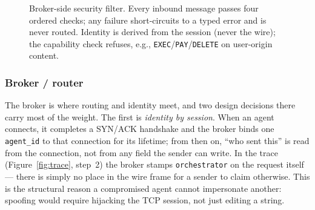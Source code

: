 \documentclass[11pt]{article}
\begin{document}
\begin{figure}[h]\centering
{}
\caption{Broker-side security filter. Every inbound message passes four ordered checks; any failure
short-circuits to a typed error and is never routed. Identity is derived from the session (never the
wire); the capability check refuses, e.g., \texttt{EXEC}/\texttt{PAY}/\texttt{DELETE} on user-origin
content.}
\label{fig:security}
\end{figure}

\subsubsection{Broker / router}\label{sec:arch:broker}
The broker is where routing and identity meet, and two design decisions there carry most of the weight.
The first is \emph{identity by session}. When an agent connects, it completes a SYN/ACK handshake and
the broker binds one \texttt{agent\_id} to that connection for its lifetime; from then on, ``who sent
this'' is read from the connection, not from any field the sender can write. In the trace
(Figure~\ref{fig:trace}, step~2) the broker stamps \texttt{orchestrator} on the request itself ---
there is simply no place in the wire frame for a sender to claim otherwise. This is the structural
reason a compromised agent cannot impersonate another: spoofing would require hijacking the TCP session,
not just editing a string.
\end{document}
